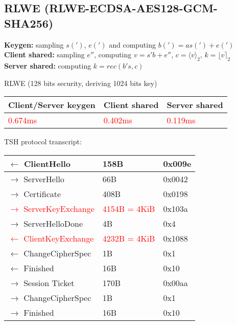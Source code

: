 \documentclass[12pt]{article}
\begin{document}
\subsection{RLWE \tiny{(RLWE-ECDSA-AES128-GCM-SHA256)}}

\footnotesize{\textbf{Keygen:} sampling $s(')$, $e(')$ and computing $b(') = as(') + e(')$\\
\textbf{Client shared:} sampling $e''$, computing $v = s'b + e''$, $c = \langle v \rangle_2$, $k = \lfloor v \rceil_2$\\
\textbf{Server shared:} computing $k = rec(b's, c)$}\\
\normalsize

RLWE (128 bits security, deriving 1024 bits key)
\begin{center}
    \begin{tabular}{| l | l | l |}
    \hline
    Client/Server keygen & Client shared & Server shared \\ \hline
    \textcolor{red}{0.674ms} & \textcolor{red}{0.402ms} & \textcolor{red}{0.119ms}  \\ \hline
    \end{tabular}
\end{center}

TSH protocol transcript:
\begin{center}
    \begin{tabular}{| l | l | l |}
    \hline
    $\leftarrow$ ClientHello & 158B & 0x009e\\ \hline
    $\rightarrow$ ServerHello & 66B & 0x0042\\ \hline
    $\rightarrow$ Certificate & 408B & 0x0198\\ \hline
    \textcolor{red}{$\rightarrow$ ServerKeyExchange} & \textcolor{red}{4154B = 4KiB} & 0x103a\\ \hline
    $\rightarrow$ ServerHelloDone & 4B & 0x4\\ \hline
    \textcolor{red}{$\leftarrow$ ClientKeyExchange} & \textcolor{red}{4232B = 4KiB} & 0x1088\\ \hline
    $\leftarrow$ ChangeCipherSpec & 1B & 0x1\\ \hline
    $\leftarrow$ Finished & 16B & 0x10\\ \hline
    $\rightarrow$ Session Ticket & 170B & 0x00aa\\ \hline
    $\rightarrow$ ChangeCipherSpec & 1B & 0x1\\ \hline
    $\rightarrow$ Finished & 16B & 0x10\\ \hline
    \end{tabular}
\end{center}
\end{document}

